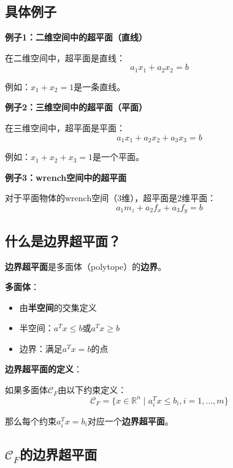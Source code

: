 \documentclass[12pt,a4paper]{article}
\begin{document}
\subsection{具体例子}

\textbf{例子1：二维空间中的超平面（直线）}

在二维空间中，超平面是直线：
\begin{equation}
a_1 x_1 + a_2 x_2 = b
\end{equation}

例如：$x_1 + x_2 = 1$是一条直线。

\textbf{例子2：三维空间中的超平面（平面）}

在三维空间中，超平面是平面：
\begin{equation}
a_1 x_1 + a_2 x_2 + a_3 x_3 = b
\end{equation}

例如：$x_1 + x_2 + x_3 = 1$是一个平面。

\textbf{例子3：wrench空间中的超平面}

对于平面物体的wrench空间（3维），超平面是2维平面：
\begin{equation}
a_1 m_z + a_2 f_x + a_3 f_y = b
\end{equation}

\subsection{什么是边界超平面？}

\textbf{边界超平面}是多面体（polytope）的\textbf{边界}。

\textbf{多面体}：
\begin{itemize}
\item 由\textbf{半空间}的交集定义
\item 半空间：$a^T x \leq b$或$a^T x \geq b$
\item 边界：满足$a^T x = b$的点
\end{itemize}

\textbf{边界超平面的定义}：

如果多面体$\mathcal{C}_F$由以下约束定义：
\begin{equation}
\mathcal{C}_F = \{x \in \mathbb{R}^n \mid a_i^T x \leq b_i, i = 1, \ldots, m\}
\end{equation}

那么每个约束$a_i^T x = b_i$对应一个\textbf{边界超平面}。

\subsection{$\mathcal{C}_F$的边界超平面}
\end{document}
